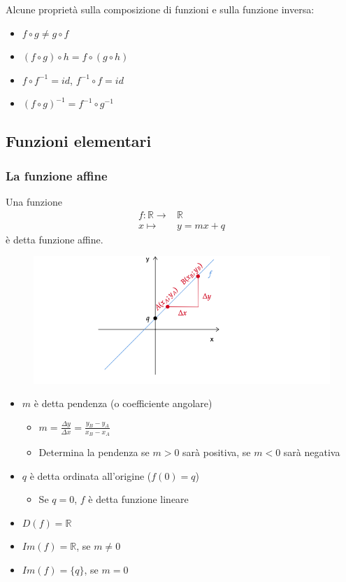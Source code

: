 \documentclass[../main.tex]{subfiles}
\begin{document}
Alcune proprietà sulla composizione di funzioni e sulla funzione inversa:
\begin{itemize}
    \item $f \circ g \neq g \circ f$
    \item $(f \circ g) \circ h = f \circ (g \circ h)$
    \item $f \circ f^{-1} = id$, $f^{-1} \circ f = id$
    \item $(f \circ g)^{-1} = f^{-1} \circ g^{-1}$
\end{itemize}

\pagebreak
\subsection{Funzioni elementari}
\subsubsection{La funzione affine}
Una funzione
\begin{align*}
    f: \mathbb{R} \longrightarrow& \mathbb{R} \\
    x \longmapsto& y = mx + q
\end{align*}
è detta funzione affine.
\begin{figure}[h]
    \centering
    \includegraphics[width=1\textwidth]{images/funzioneLineare.png}
\end{figure}

\begin{itemize}
    \item $m$ è detta pendenza (o coefficiente angolare)
    \begin{itemize}
        \item $m = \frac{\Delta y}{\Delta x} = \frac{y_B - y_A}{x_B-x_A}$
        \item Determina la pendenza se $m>0$ sarà positiva, se $m<0$ sarà negativa
    \end{itemize}
    \item $q$ è detta ordinata all'origine ($f(0) = q$)
    \begin{itemize}
        \item Se $q = 0$, $f$ è detta funzione lineare
    \end{itemize}
    \item $D(f) = \mathbb{R}$
    \item $Im(f) = \mathbb{R}$, se $m\neq 0$
    \item $Im(f) = \{ q\} $, se $m=0$
\end{itemize}
\end{document}
